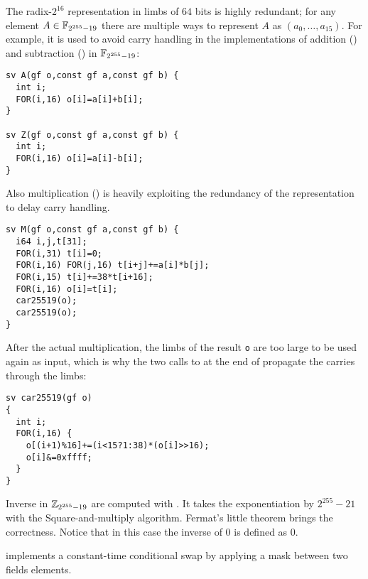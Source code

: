 The radix-$2^{16}$ representation in limbs of $64$ bits is
highly redundant; for any element $A \in \mathbb{F}_{2^{255}-19}$ there are
multiple ways to represent $A$ as $(a_0,\dots,a_{15})$.
For example, it is used to avoid carry handling in
the implementations of addition ()
and subtraction () in $\mathbb{F}_{2^{255}-19}$:

\begin{lstlisting}[language=Ctweetnacl]
sv A(gf o,const gf a,const gf b) {
  int i;
  FOR(i,16) o[i]=a[i]+b[i];
}

sv Z(gf o,const gf a,const gf b) {
  int i;
  FOR(i,16) o[i]=a[i]-b[i];
}
\end{lstlisting}

Also multiplication () is heavily exploiting the redundancy
of the representation to delay carry handling.

\begin{lstlisting}[language=Ctweetnacl]
sv M(gf o,const gf a,const gf b) {
  i64 i,j,t[31];
  FOR(i,31) t[i]=0;
  FOR(i,16) FOR(j,16) t[i+j]+=a[i]*b[j];
  FOR(i,15) t[i]+=38*t[i+16];
  FOR(i,16) o[i]=t[i];
  car25519(o);
  car25519(o);
}
\end{lstlisting}

After the actual multiplication, the limbs of the result \texttt{o} are
too large to be used again as input, which is why the two calls to
 at the end of  propagate the carries through the limbs:

\begin{lstlisting}[language=Ctweetnacl]
sv car25519(gf o)
{
  int i;
  FOR(i,16) {
    o[(i+1)%16]+=(i<15?1:38)*(o[i]>>16);
    o[i]&=0xffff;
  }
}
\end{lstlisting}

Inverse in $\mathbb{Z}_{2^{255}-19}$ are computed with .
It takes the exponentiation by $2^{255}-21$ with the Square-and-multiply algorithm.
Fermat's little theorem brings the correctness.
Notice that in this case the inverse of $0$ is defined as $0$.

 implements a constant-time conditional swap by applying a mask between
two fields elements.


